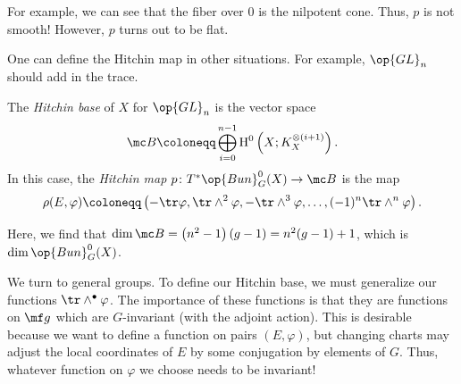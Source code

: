 \documentclass[../notes.tex]{subfiles}
\begin{document}
\begin{remark}
	For example, we can see that the fiber over $0$ is the nilpotent cone. Thus, $p$ is not smooth! However, $p$ turns out to be flat.
\end{remark}
One can define the Hitchin map in other situations. For example, $\op{GL}_n$ should add in the trace.
\begin{definition}
	The \textit{Hitchin base} of $X$ for $\op{GL}_n$ is the vector space
	\[\mc B\coloneqq\bigoplus_{i=0}^{n-1}\mathrm H^0\left(X;K_X^{\otimes (i+1)}\right).\]
	In this case, the \textit{Hitchin map} $p\colon T^*\op{Bun}_G^0(X)\to\mc B$ is the map
	\[\rho(E,\varphi)\coloneqq\left(-\tr\varphi,\tr\land^2\varphi,-\tr\land^3\varphi,\ldots,(-1)^n\tr\land^n\varphi\right).\]
\end{definition}
\begin{remark}
	Here, we find that $\dim\mc B=\left(n^2-1\right)(g-1)=n^2(g-1)+1$, which is $\dim\op{Bun}_G^0(X)$.
\end{remark}
We turn to general groups. To define our Hitchin base, we must generalize our functions $\tr\land^\bullet\varphi$. The importance of these functions is that they are functions on $\mf g$ which are $G$-invariant (with the adjoint action). This is desirable because we want to define a function on pairs $(E,\varphi)$, but changing charts may adjust the local coordinates of $E$ by some conjugation by elements of $G$. Thus, whatever function on $\varphi$ we choose needs to be invariant!
\end{document}
